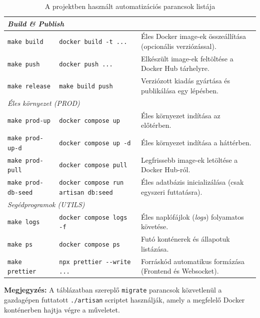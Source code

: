\begin{table}[h!]
\begin{tabularx}{\textwidth}{|l|X|X|}
        \multicolumn{3}{|l|}{\cellcolor[HTML]{F5F5F5}\textit{Build \& Publish}} \\ \hline
        \texttt{make build} & \texttt{docker build -t ...} & Éles Docker image-ek összeállítása (opcionális verziózással). \\ \hline
        \texttt{make push} & \texttt{docker push ...} & Elkészült image-ek feltöltése a Docker Hub tárhelyre. \\ \hline
        \texttt{make release} & \texttt{make build push} & Verziózott kiadás gyártása és publikálása egy lépésben. \\ \hline
        
        \multicolumn{3}{|l|}{\cellcolor[HTML]{F5F5F5}\textit{Éles környezet (PROD)}} \\ \hline
        \texttt{make prod-up} & \texttt{docker compose up} & Éles környezet indítása az előtérben. \\ \hline
        \texttt{make prod-up-d} & \texttt{docker compose up -d} & Éles környezet indítása a háttérben. \\ \hline
        \texttt{make prod-pull} & \texttt{docker compose pull} & Legfrissebb image-ek letöltése a Docker Hub-ról. \\ \hline
        \texttt{make prod-db-seed} & \texttt{docker compose run artisan db:seed} & Éles adatbázis inicializálása (csak egyszeri futtatásra). \\ \hline
        
        \multicolumn{3}{|l|}{\cellcolor[HTML]{F5F5F5}\textit{Segédprogramok (UTILS)}} \\ \hline
        \texttt{make logs} & \texttt{docker compose logs -f} & Éles naplófájlok (\textit{logs}) folyamatos követése. \\ \hline
        \texttt{make ps} & \texttt{docker compose ps} & Futó konténerek és állapotuk listázása. \\ \hline
        \texttt{make prettier} & \texttt{npx prettier -{}-write ...} & Forráskód automatikus formázása (Frontend és Websocket). \\ \hline
    \end{tabularx}
    \caption{A projektben használt automatizációs parancsok listája}
\end{table}

\noindent \textbf{Megjegyzés:} A táblázatban szereplő \texttt{migrate} parancsok közvetlenül a gazdagépen futtatott \texttt{./artisan} scriptet használják, amely a megfelelő Docker konténerben hajtja végre a műveletet.